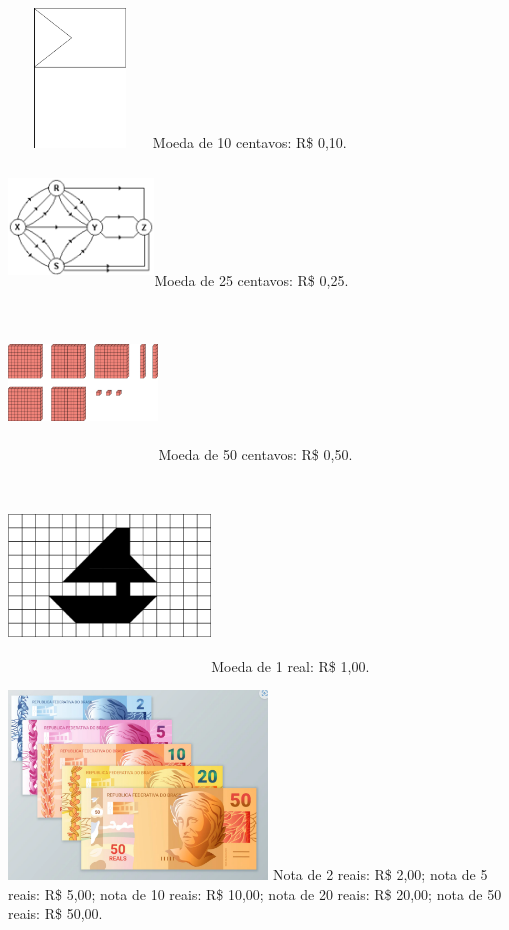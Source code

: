 \begin{mdframed}[linewidth=2pt,linecolor=salmao,roundcorner=2pt]
{\includegraphics[width=1.50833in,height=1.45668in]{media/image74.png}Moeda
de 10 centavos: R\$ 0,10.

\includegraphics[width=1.52500in,height=1.24749in]{media/image75.png}Moeda
de 25 centavos: R\$ 0,25.

\includegraphics[width=1.56667in,height=1.61849in]{media/image76.png}Moeda
de 50 centavos: R\$ 0,50.

\includegraphics[width=2.11667in,height=2.01180in]{media/image77.png}Moeda
de 1 real: R\$ 1,00.

\includegraphics[width=2.71068in,height=1.97500in]{media/image78.png}
Nota de 2 reais: R\$ 2,00; nota de 5 reais: R\$ 5,00; nota de 10 reais: R\$ 10,00; nota de 20 reais: R\$ 20,00; nota de 50 reais: R\$ 50,00.

}
\end{mdframed}
